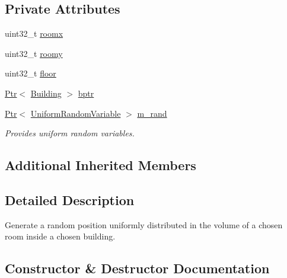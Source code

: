 \subsection*{Private Attributes}
\begin{DoxyCompactItemize}
\item 
uint32\+\_\+t \hyperlink{classns3_1_1FixedRoomPositionAllocator_a08406a888fd0dc8dc4e3e90663c32143}{roomx}
\item 
uint32\+\_\+t \hyperlink{classns3_1_1FixedRoomPositionAllocator_a08f9c20dddaeca5a037c2ffc53a530b8}{roomy}
\item 
uint32\+\_\+t \hyperlink{classns3_1_1FixedRoomPositionAllocator_a07f2a6625304929b73cb36fecbcc1dc8}{floor}
\item 
\hyperlink{classns3_1_1Ptr}{Ptr}$<$ \hyperlink{classns3_1_1Building}{Building} $>$ \hyperlink{classns3_1_1FixedRoomPositionAllocator_a535f5e37d90dc0585074928f33d4649f}{bptr}
\item 
\hyperlink{classns3_1_1Ptr}{Ptr}$<$ \hyperlink{classns3_1_1UniformRandomVariable}{Uniform\+Random\+Variable} $>$ \hyperlink{classns3_1_1FixedRoomPositionAllocator_a42af4513f6adbd7c680c0ed9e7a3ca17}{m\+\_\+rand}
\begin{DoxyCompactList}\small\item\em Provides uniform random variables. \end{DoxyCompactList}\end{DoxyCompactItemize}
\subsection*{Additional Inherited Members}


\subsection{Detailed Description}
Generate a random position uniformly distributed in the volume of a chosen room inside a chosen building. 

\subsection{Constructor \& Destructor Documentation}
